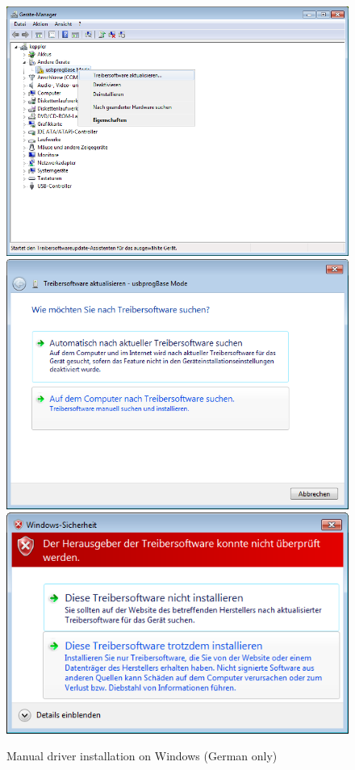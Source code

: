 \documentclass[bibtotoc,UKenglish,halfparskip,oneside,DIV12]{scrreprt}
\begin{document}
\begin{figure}[p]
  \centering
  \includegraphics[scale=.58]{images/win7_2.png} \\[1mm]
  \includegraphics[scale=.58]{images/win7_3.png} \\[1mm]
  \includegraphics[scale=.58]{images/win7_4.png}
  \caption{Manual driver installation on Windows (German only)}
  \label{fig:windows_manual_driver}
\end{figure}
\end{document}
